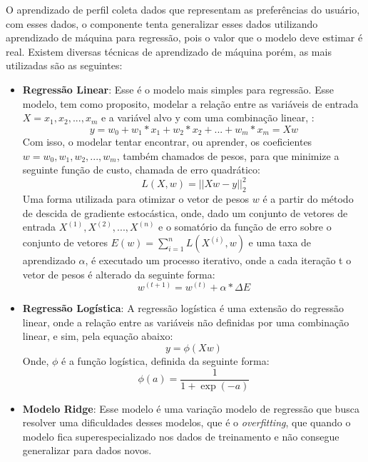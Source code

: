 O aprendizado de perfil coleta dados que representam as preferências do usuário, com esses dados, o componente tenta generalizar esses dados utilizando aprendizado de máquina para regressão, pois o valor que o modelo deve estimar é real. Existem diversas técnicas de aprendizado de máquina porém, as mais utilizadas são as seguintes:
\begin{itemize}
    \item \textbf{Regressão Linear}: Esse é o modelo mais simples para regressão. Esse modelo, tem como proposito, modelar a relação entre as variáveis de entrada \(X = x_1, x_2, ..., x_m\) e a variável alvo y com uma combinação linear,  \cite{bishop2006pattern}:
    \begin{equation}
        y = w_0 + w_1 * x_1 + w_2 * x_2 + ... + w_m * x_m = Xw
    \end{equation}
    Com isso, o modelar tentar encontrar, ou aprender, os coeficientes \(w = w_0, w_1, w_2, ..., w_m\), também chamados de pesos, para que minimize a seguinte função de custo, chamada de erro quadrático:
     \begin{equation}
        L(X, w) = || Xw - y ||_{2}^{2}
    \end{equation}
    Uma forma utilizada para otimizar o vetor de pesos \(w\) é a partir do método de descida de gradiente estocástica, onde, dado um conjunto de vetores de entrada \(X^{(1)}, X^{(2)}, ..., X^{(n)}\) e o somatório da função de erro sobre o conjunto de vetores \(E(w) = \sum_{i=1}^{n} L(X^{(i)}, w)\) e uma taxa de aprendizado \(\alpha\), é executado um processo iterativo, onde a cada iteração t o vetor de pesos é alterado da seguinte forma:
    \begin{equation}
        w^{(t+1)} = w^{(t)} + \alpha * \Delta E 
    \end{equation}
    \item \textbf{Regressão Logística}: A regressão logística é uma extensão do regressão linear, onde a relação entre as variáveis não definidas por uma combinação linear, e sim, pela equação abaixo:
    \begin{equation}
        y = \phi(Xw)
    \end{equation}
    Onde, \(\phi\) é a função logística, definida da seguinte forma:
    \begin{equation}
        \phi(a) = \frac{1}{1 + \exp(-a)}
    \end{equation}
    \item \textbf{Modelo Ridge}: Esse modelo é uma variação modelo de regressão que busca resolver uma dificuldades desses modelos, que é o \textit{overfitting}, que quando o modelo fica superespecializado nos dados de treinamento e não consegue generalizar para dados novos\cite{Goodfellow-et-al-2016}.
    

\end{itemize}
